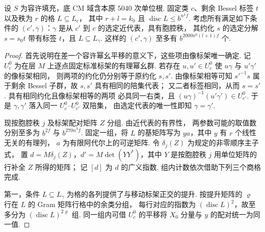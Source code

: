 \begin{lemma}[固定标签与公共格后的单项计数]
\label{lem:b-frames-over-lattice}
\emitthmsource
设 $S$ 为容许填充，底 CM 域含本原 $5040$ 次单位根.
固定类 $c$、剩余 Bessel 标签 $t$ 以及秩为 $r$ 的格 $L\subseteq L_c$，
其中 $r+l=k_0$ 且 $\operatorname{disc}L\le b^{n^3 f}$.
考虑所有满足如下条件的 $(c',\gamma)$：$\gamma$ 是从 $c'$ 到 $c$ 的选定近代表，具有胞腔秩，
其约化 $s$ 的选定分解 $s=s_0t$ 带有标签 $t$，且 $L\subseteq L_\gamma$.
这样的 $(c',\gamma)$ 至多有 $b^{2000n^6(l+1)f}$ 个.
\end{lemma}
\begin{proof}
首先说明在差一个容许幂幺平移的意义下，这些项由像标架唯一确定.
记 $U_c^0$ 为在层 $M$ 上逐点固定标准标架的有理幂幺群.
若存在 $u,u'\in U_c^0$ 使 $u\gamma$ 与 $u'\gamma'$ 的像标架相同，
则两项的约化仍分别等于原约化 $s,s'$.
由像标架相等可知 $s'^{-1}s$ 属于剩余 Bessel 子群，故 $s,s'$ 具有相同的陪集代表；
又二者标签相同，从而 $s=s'$. 具有相同约化且像标架相等的两项
必具同一右类，且 $(u\gamma)^{-1}(u'\gamma')\in U_{c'}^0$.
于是 $\gamma,\gamma'$ 落入同一 $U_c^0$--$U_{c'}^0$ 双陪集，
由选定代表的唯一性即知 $\gamma=\gamma'$.

现按胞腔秩 $j$ 及标架配对矩阵 $Z$ 分组. 由近代表的有界性，
两参数可能的取值数分别至多为 $b^{2f}$ 与 $b^{270n^3 f}$.
固定一组，将 $L$ 的基矩阵写为 $ya$，其中 $y$ 有 $r$ 个线性无关的有理列，
$a$ 为有限阿代尔上的可逆矩阵. 令 $\delta_j(Z)$ 为规定的非零顺序主子式，
置 $d=M\delta_j(Z)$，$d'=M\det(YY^*)$，其中 $Y$ 是按胞腔秩 $j$ 用单位矩阵的行补全 $Z$ 所得的矩阵；
记 $[d]$ 为 $d$ 的广义指数. 组内计数依次借助下列三个商格完成.

第一，条件 $L\subseteq L_\gamma$ 为格的各列提供了与移动标架正交的提升.
按提升矩阵的 $\varrho$ 行在 $L$ 的 Gram 矩阵行格中的余类分组，
每行对应的指数为 $(\operatorname{disc}L)^2$，故至多分为 $(\operatorname{disc}L)^{2\varrho}$ 组.
同一组内可借 $U_c^0$ 的平移将 $X_0$ 分量与 $y$ 的配对统一为同一值.


\end{proof}
